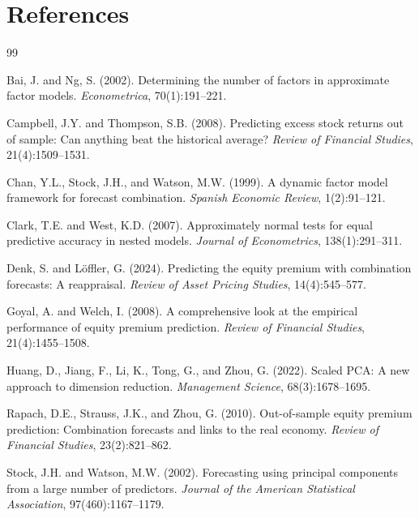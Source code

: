 \documentclass[a4paper,11pt]{article}
\begin{document}
\section*{References}
\begingroup
\renewcommand{\section}[2]{}
\small

\begin{thebibliography}{99}

Bai, J. and Ng, S. (2002).
Determining the number of factors in approximate factor models.
\textit{Econometrica}, 70(1):191--221.

Campbell, J.Y. and Thompson, S.B. (2008).
Predicting excess stock returns out of sample: Can anything beat the historical average?
\textit{Review of Financial Studies}, 21(4):1509--1531.

Chan, Y.L., Stock, J.H., and Watson, M.W. (1999).
A dynamic factor model framework for forecast combination.
\textit{Spanish Economic Review}, 1(2):91--121.

Clark, T.E. and West, K.D. (2007).
Approximately normal tests for equal predictive accuracy in nested models.
\textit{Journal of Econometrics}, 138(1):291--311.

Denk, S. and L\"{o}ffler, G. (2024).
Predicting the equity premium with combination forecasts: A reappraisal.
\textit{Review of Asset Pricing Studies}, 14(4):545--577.

Goyal, A. and Welch, I. (2008).
A comprehensive look at the empirical performance of equity premium prediction.
\textit{Review of Financial Studies}, 21(4):1455--1508.

Huang, D., Jiang, F., Li, K., Tong, G., and Zhou, G. (2022).
Scaled PCA: A new approach to dimension reduction.
\textit{Management Science}, 68(3):1678--1695.

Rapach, D.E., Strauss, J.K., and Zhou, G. (2010).
Out-of-sample equity premium prediction: Combination forecasts and links to the real economy.
\textit{Review of Financial Studies}, 23(2):821--862.

Stock, J.H. and Watson, M.W. (2002).
Forecasting using principal components from a large number of predictors.
\textit{Journal of the American Statistical Association}, 97(460):1167--1179.


\end{thebibliography}
\end{document}
